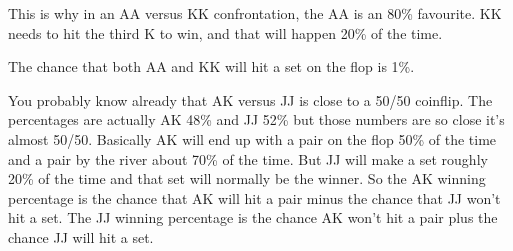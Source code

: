 This is why in an AA versus KK confrontation, the AA is an 80\% favourite.
KK needs to hit the third K to win, and that will happen 20\% of the time.

The chance that both AA and KK will hit a set on the flop is 1\%.

You probably know already that AK versus JJ is close to a 50/50 coinflip.
The percentages are actually AK 48\% and JJ 52\% but those numbers are so
close it's almost 50/50. Basically AK will end up with a pair on the flop 50\%
of the time and a pair by the river about 70\% of the time. But JJ will make
a set roughly 20\% of the time and that set will normally be the winner. So the AK winning percentage is
the chance that AK will hit a pair minus the chance that JJ won't hit a set.
The JJ winning percentage is the chance AK won't hit a pair plus the chance
JJ will hit a set.


